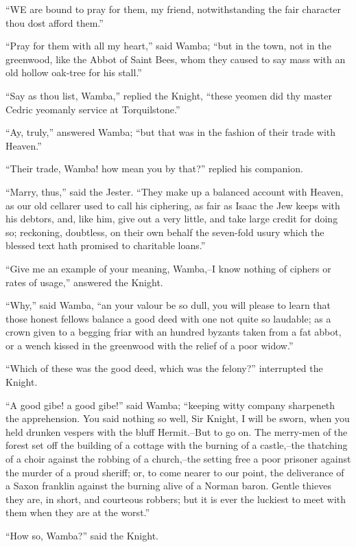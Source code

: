 ``WE are bound to pray for them, my friend, notwithstanding the fair
character thou dost afford them.''

``Pray for them with all my heart,'' said Wamba; ``but in the town, not
in the greenwood, like the Abbot of Saint Bees, whom they caused to say
mass with an old hollow oak-tree for his stall.''

``Say as thou list, Wamba,'' replied the Knight, ``these yeomen did thy
master Cedric yeomanly service at Torquilstone.''

``Ay, truly,'' answered Wamba; ``but that was in the fashion of their
trade with Heaven.''

``Their trade, Wamba! how mean you by that?'' replied his companion.

``Marry, thus,'' said the Jester. ``They make up a balanced account with
Heaven, as our old cellarer used to call his ciphering, as fair as Isaac
the Jew keeps with his debtors, and, like him, give out a very little,
and take large credit for doing so; reckoning, doubtless, on their own
behalf the seven-fold usury which the blessed text hath promised to
charitable loans.''

``Give me an example of your meaning, Wamba,--I know nothing of ciphers
or rates of usage,'' answered the Knight.

``Why,'' said Wamba, ``an your valour be so dull, you will please to
learn that those honest fellows balance a good deed with one not quite
so laudable; as a crown given to a begging friar with an hundred byzants
taken from a fat abbot, or a wench kissed in the greenwood with the
relief of a poor widow.''

``Which of these was the good deed, which was the felony?'' interrupted
the Knight.

``A good gibe! a good gibe!'' said Wamba; ``keeping witty company
sharpeneth the apprehension. You said nothing so well, Sir Knight, I
will be sworn, when you held drunken vespers with the bluff Hermit.--But
to go on. The merry-men of the forest set off the building of a cottage
with the burning of a castle,--the thatching of a choir against the
robbing of a church,--the setting free a poor prisoner against the
murder of a proud sheriff; or, to come nearer to our point, the
deliverance of a Saxon franklin against the burning alive of a Norman
baron. Gentle thieves they are, in short, and courteous robbers; but it
is ever the luckiest to meet with them when they are at the worst.''

``How so, Wamba?'' said the Knight.

